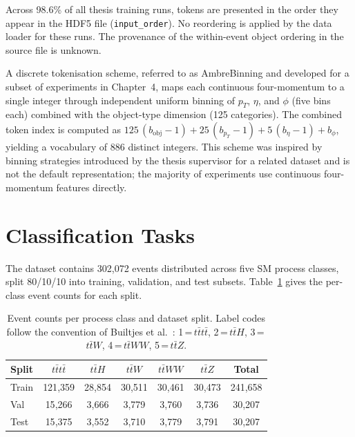 Across 98.6\% of all thesis training runs, tokens are presented in the order they appear
in the HDF5 file (\texttt{input\_order}). No reordering is applied by the data loader for
these runs. The provenance of the within-event object ordering in the source file is
unknown. 

A discrete tokenisation scheme, referred to as AmbreBinning and developed for a subset of
experiments in Chapter~4, maps each continuous four-momentum to a single integer through
independent uniform binning of $p_T$, $\eta$, and $\phi$ (five bins each) combined with
the object-type dimension (125 categories). The combined token index is computed as
$125\,(b_{\text{obj}}-1) + 25\,(b_{p_T}-1) + 5\,(b_\eta-1) + b_\phi$, yielding a
vocabulary of 886 distinct integers. This scheme was inspired by binning strategies
introduced by the thesis supervisor for a related dataset and is not the default
representation; the majority of experiments use continuous four-momentum features directly.

\section{Classification Tasks}
\label{sec:dataset_tasks}

The dataset contains 302,072 events distributed across five SM process classes, split
80/10/10 into training, validation, and test subsets.
Table~\ref{tab:sample_counts} gives the per-class event counts for each split.

\begin{table}[h]
\centering
\caption{Event counts per process class and dataset split. Label codes follow the
convention of Builtjes et al.\ \cite{builtjesAttentionStrengthsPhysical2025}:
1\,=\,$t\bar{t}t\bar{t}$, 2\,=\,$t\bar{t}H$, 3\,=\,$t\bar{t}W$,
4\,=\,$t\bar{t}WW$, 5\,=\,$t\bar{t}Z$.}
\label{tab:sample_counts}
\begin{tabular}{lccccc|c}
\hline
\textbf{Split} & $t\bar{t}t\bar{t}$ & $t\bar{t}H$ & $t\bar{t}W$ & $t\bar{t}WW$ &
$t\bar{t}Z$ & \textbf{Total} \\
\hline
Train & 121{,}359 & 28{,}854 & 30{,}511 & 30{,}461 & 30{,}473 & 241{,}658 \\
Val   & 15{,}266  & 3{,}666  & 3{,}779  & 3{,}760  & 3{,}736  & 30{,}207  \\
Test  & 15{,}375  & 3{,}552  & 3{,}710  & 3{,}779  & 3{,}791  & 30{,}207  \\
\hline
\end{tabular}
\end{table}

